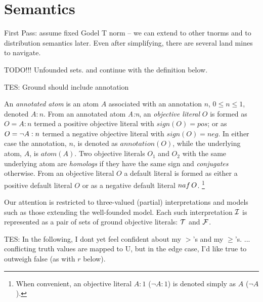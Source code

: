 \section{Semantics}\label{sec:semantics}
%
{\sc First Pass: assume fixed Godel T norm -- we can extend to other
  tnorms and to distribution semantics later.  Even after simplifying,
  there are several land mines to navigate.

TODO!!! 
Unfounded sets. and continue with the definition below.
}



TES: Ground should include annotation

An {\em annotated atom} is an atom $A$ associated with an annotation
$n$, $0 \leq n \leq 1$, denoted $A:n$.  From an annotated atom {\em
  A:n}, an {\em objective literal} $O$ is formed as $O = A:n$ termed a
positive objective literal with $sign(O) = pos$; or as $O = \neg A:n$
termed a negative objective literal with $sign(O) = neg$.  In either
case the annotation, $n$, is denoted as $ annotation(O)$, while the
underlying atom, $A$, is $atom(A)$.
%
Two objective literals $O_1$ and $O_2$ with the same underlying atom are {\em homologs} if they have the same sign and {\em conjugates} otherwise.
%
%
From an objective literal $O$ a default literal is formed as either a
positive default literal $O$ or as a negative default literal ${naf}\,
O$.
\footnote{
When convenient, an objective literal $A:1$ ($\neg A:1$) is denoted
simply as $A$ ($\neg A$).}

Our attention is restricted to three-valued (partial) interpretations
and models such as those extending the well-founded model.  Each such
interpretation $\cI$ is represented as a pair of sets of ground
objective literals: $\cT$ and $\cF$.

{\sc TES: In the following, I dont yet feel confident about my $>$'s and my
$\geq$'s.  ... conflicting truth values are mapped to U, but in the
edge case, I'd like true to outweigh false (as with $r$ below).}


